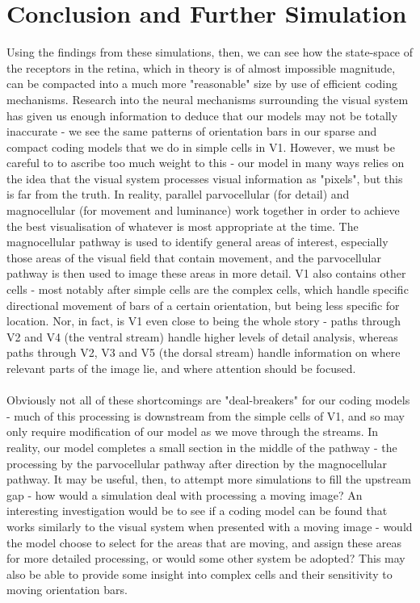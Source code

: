 \documentclass[12pt]{article}
\begin{document}
\section{Conclusion and Further Simulation}
Using the findings from these simulations, then, we can see how the state-space of the receptors in the retina, which in theory is of almost impossible magnitude, can be compacted into a much more "reasonable" size by use of efficient coding mechanisms. Research into the neural mechanisms surrounding the visual system has given us enough information to deduce that our models may not be totally inaccurate - we see the same patterns of orientation bars in our sparse and compact coding models that we do in simple cells in V1. However, we must be careful to to ascribe too much weight to this - our model in many ways relies on the idea that the visual system processes visual information as "pixels", but this is far from the truth. In reality, parallel parvocellular (for detail) and magnocellular (for movement and luminance) work together in order to achieve the best visualisation of whatever is most appropriate at the time. The magnocellular pathway is used to identify general areas of interest, especially those areas of the visual field that contain movement, and the parvocellular pathway is then used to image these areas in more detail. V1 also contains other cells - most notably after simple cells are the complex cells, which handle specific directional movement of bars of a certain orientation, but being less specific for location. Nor, in fact, is V1 even close to being the whole story - paths through V2 and V4 (the ventral stream) handle higher levels of detail analysis, whereas paths through V2, V3 and V5 (the dorsal stream) handle information on where relevant parts of the image lie, and where attention should be focused.\\\hfill\\
Obviously not all of these shortcomings are "deal-breakers" for our coding models - much of this processing is downstream from the simple cells of V1, and so may only require modification of our model as we move through the streams. In reality, our model completes a small section in the middle of the pathway - the processing by the parvocellular pathway after direction by the magnocellular pathway. It may be useful, then, to attempt more simulations to fill the upstream gap - how would a simulation deal with processing a moving image? An interesting investigation would be to see if a coding model can be found that works similarly to the visual system when presented with a moving image - would the model choose to select for the areas that are moving, and assign these areas for more detailed processing, or would some other system be adopted? This may also be able to provide some insight into complex cells and their sensitivity to moving orientation bars.\\\hfill\\
\end{document}
